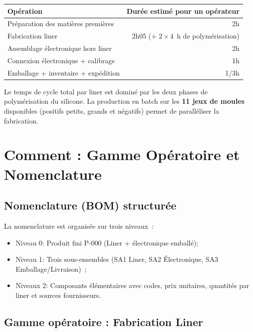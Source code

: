 \vspace{0.5em}
\begin{center}
\begin{tabular}{lr}
  \toprule
  \textbf{Opération} & \textbf{Durée estimé pour un opérateur} \\
  \midrule
  Préparation des matières premières     & 2h \\
  Fabrication liner                      & 2h05 ($+$ $2 \times 4$~h de polymérisation)  \\
  Assemblage électronique hors liner     & 2h     \\
  Connexion électronique + calibrage     & 1h       \\
  Emballage + inventaire + expédition    & 1/3h \\
  \bottomrule
\end{tabular}
\end{center}
\vspace{0.5em}
Le temps de cycle total par liner est dominé par les deux phases de polymérisation du silicone.
La production en batch sur les \textbf{11 jeux de moules} disponibles (positifs
petits, grands et négatifs) permet de paralléliser la fabrication.




\section{Comment : Gamme Opératoire et Nomenclature}

\subsection{Nomenclature (BOM) structurée}

La nomenclature est organisée sur trois niveaux~:
\begin{itemize}
  \item Niveau 0: Produit fini P-000 (Liner + électronique emballé);
  \item Niveau 1: Trois sous-ensembles (SA1 Liner, SA2 Électronique, SA3 Emballage/Livraison)~;
  \item Niveaux 2: Composants élémentaires avec codes, prix unitaires, quantités par liner
    et sources fournisseurs.
\end{itemize}

\subsection{Gamme opératoire : Fabrication Liner}

